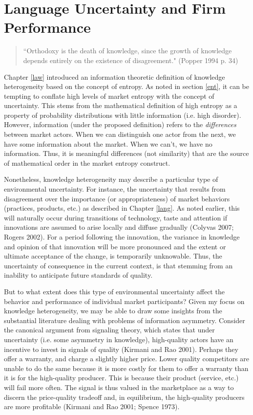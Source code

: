 \chapter{Language Uncertainty and Firm Performance \label{signal}}


\begin{small}
\begin{quote}
``Orthodoxy is the death of knowledge, since the growth of knowledge depends entirely on the existence of disagreement." (Popper 1994 p. 34) 
\end{quote}
\end{small}

Chapter \ref{law} introduced an information theoretic definition of knowledge heterogeneity based on the concept of entropy. As noted in section \ref{ent}, it can be tempting to conflate high levels of market entropy with the concept of uncertainty. This stems from the mathematical definition of high entropy as a property of probability distributions with little information (i.e. high disorder). However, information (under the proposed definition) refers to the \emph{differences} between market actors. When we can distinguish one actor from the next, we have some information about the market. When we can't, we have no information. Thus, it is meaningful differences (not similarity) that are the source of mathematical order in the market entropy construct. 

Nonetheless, knowledge heterogeneity may describe a particular type of environmental uncertainty. For instance, the uncertainty that results from disagreement over the importance (or appropriateness) of market behaviors (practices, products, etc.) as described in Chapter \ref{lang}. As noted earlier, this will naturally occur during transitions of technology, taste and attention if innovations are assumed to arise locally and diffuse gradually (Colyvas 2007; Rogers 2002). For a period following the innovation, the variance in knowledge and opinion of that innovation will be more pronounced and the extent or ultimate acceptance of the change, is temporarily unknowable. Thus, the uncertainty of consequence in the current context, is that stemming from an inability to anticipate future standards of quality.

But to what extent does this type of environmental uncertainty affect the behavior and performance of individual market participants? Given my focus on knowledge heterogeneity, we may be able to draw some insights from the substantial literature dealing with problems of information asymmetry. Consider the canonical argument from signaling theory, which states that under uncertainty (i.e. some asymmetry in knowledge), high-quality actors have an incentive to invest in signals of quality (Kirmani and Rao 2001). Perhaps they offer a warranty, and charge a slightly higher price. Lower quality competitors are unable to do the same because it is more costly for them to offer a warranty than it is for the high-quality producer. This is because their product (service, etc.) will fail more often. The signal is thus valued in the marketplace as a way to discern the price-quality tradeoff and, in equilibrium, the high-quality producers are more profitable (Kirmani and Rao 2001; Spence 1973).

